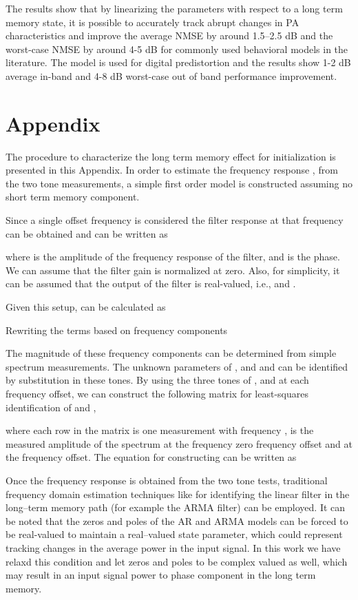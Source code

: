 \documentclass[journal]{IEEEtran}
\begin{document}
The results show that by linearizing the parameters with respect to a long term memory state, it is possible to accurately track abrupt changes in PA characteristics and improve the average NMSE by around 1.5--2.5 dB and the worst-case NMSE by around 4-5 dB for commonly used behavioral models in the literature. The model is used for digital predistortion and the results show 1-2 dB average in-band and 4-8 dB worst-case out of band performance improvement.

\renewcommand{\theequation}{A.\arabic{equation}}
\setcounter{equation}{0}

\section*{Appendix}\label{append}
The procedure to characterize the long term memory effect for initialization is presented in this Appendix. In order to estimate the frequency response , from the two tone measurements, a simple first order model is constructed assuming no short term memory component.

Since a single offset frequency is considered the filter response at that frequency can be obtained and  can be written as

where  is the amplitude of the frequency response of the filter, and  is the phase. We can assume that the filter gain is normalized at zero.
Also, for simplicity, it can be assumed that the output of the filter is real-valued, i.e.,  and .

Given this setup,  can be calculated as

Rewriting the terms based on frequency components


The magnitude of these frequency components can be determined from simple spectrum measurements. The unknown parameters of ,  and  and can be identified by substitution in these tones. By using the three tones of ,  and  at each frequency offset, we can construct the following matrix for least-squares identification of  and ,

where each row in the matrix is one measurement with frequency ,  is the measured amplitude of the spectrum at the frequency zero frequency offset and  at the  frequency offset. The equation for constructing  can be written as


Once the frequency response is obtained from the two tone tests, traditional frequency domain estimation techniques 
like \cite[p. 230]{ljung} for identifying the linear filter in the long--term memory path (for example the ARMA 
filter) can be employed. It can be noted that the zeros and poles of the AR and ARMA models can be forced to 
be real-valued to maintain a real--valued state parameter, which could represent tracking changes in the 
average power in the input signal. In this work we have relaxd this condition and let zeros and poles to be 
complex valued as well, which may result in an input signal power to phase component in the long term memory.
\end{document}
